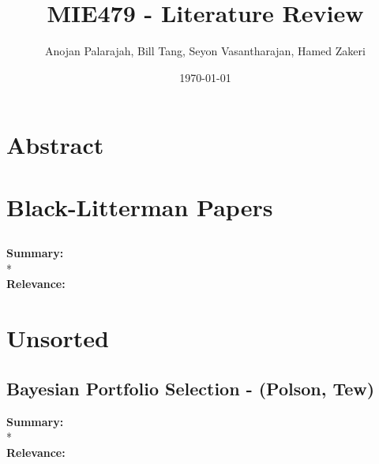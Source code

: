 \documentclass[11pt]{article}
\title{ MIE479 - Literature Review}
\author{ Anojan Palarajah, Bill Tang, Seyon Vasantharajan, Hamed Zakeri }
\date{\today}
\begin{document}
\maketitle	
\pagebreak

\tableofcontents
\pagebreak


\section{Abstract}


\pagebreak

\section{Black-Litterman Papers}

\subsection{\textnormal{}} 

\textbf{Summary: } 
\\*
\\
\textbf{Relevance: } 

\section{Unsorted}

\subsection{\textnormal{Bayesian Portfolio Selection - (Polson, Tew)}} 

\textbf{Summary: } 
\\*
\\
\textbf{Relevance: } 
\end{document}
